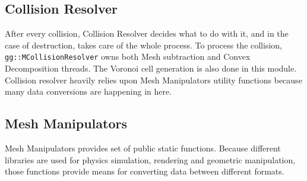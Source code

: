 \subsection*{Collision Resolver}
After every collision, Collision Resolver decides what to do with it, and in the case of destruction, takes care of the whole process. To process the collision, {\tt gg::MCollisionResolver} owns both Mesh subtraction and Convex Decomposition threads. The Voronoi cell generation is also done in this module. Collision resolver heavily relies upon Mesh Manipulators utility functions because many data conversions are happening in here.

\subsection*{Mesh Manipulators}
Mesh Manipulators provides set of public static functions. Because different libraries are used for physics simulation, rendering and geometric manipulation, those functions provide means for converting data between different formats.
